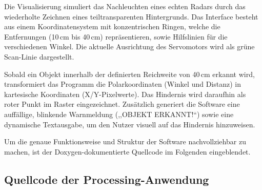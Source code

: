 Die Visualisierung simuliert das Nachleuchten eines echten Radars durch das wiederholte Zeichnen eines teiltransparenten Hintergrunds. Das Interface besteht aus einem Koordinatensystem mit konzentrischen Ringen, welche die Entfernungen (10\,cm bis 40\,cm) repräsentieren, sowie Hilfslinien für die verschiedenen Winkel. Die aktuelle Ausrichtung des Servomotors wird als grüne Scan-Linie dargestellt. 

Sobald ein Objekt innerhalb der definierten Reichweite von 40\,cm erkannt wird, transformiert das Programm die Polarkoordinaten (Winkel und Distanz) in kartesische Koordinaten (X/Y-Pixelwerte). Das Hindernis wird daraufhin als roter Punkt im Raster eingezeichnet. Zusätzlich generiert die Software eine auffällige, blinkende Warnmeldung (,,OBJEKT ERKANNT!``) sowie eine dynamische Textausgabe, um den Nutzer visuell auf das Hindernis hinzuweisen.

Um die genaue Funktionsweise und Struktur der Software nachvollziehbar zu machen, ist der Doxygen-dokumentierte Quellcode im Folgenden eingeblendet.

\newpage
\subsection{Quellcode der Processing-Anwendung}


